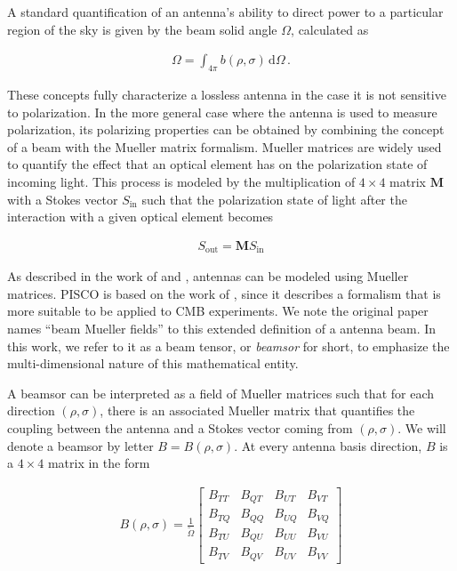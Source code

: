 \documentclass[a4paper,11pt]{article}
\begin{document}
\noindent
A standard quantification of an antenna's ability to direct power to a particular region of the sky is given by the beam solid angle $\Omega$, calculated as

\begin{equation}
\begin{aligned}
\Omega = \int_{4\pi} b(\rho,\sigma) \, \mathrm{d} \Omega \, .
\end{aligned}
\label{eq::omega_def}
\end{equation}

These concepts fully characterize a lossless antenna in the case it is not sensitive to polarization. In the more general case where the antenna is used to measure polarization, its polarizing properties can be obtained by combining the concept of a beam with the Mueller matrix formalism. Mueller matrices are widely used to quantify the effect that an optical element has on the polarization state of incoming light. This process is modeled by the multiplication of $4\times4$ matrix $\mathbf{M}$ with a Stokes vector $S_{\mathrm{in}}$ such that the polarization state of light after the interaction with a given optical element becomes

\begin{equation}
\begin{aligned}
S_{\mathrm{out}} = \mathbf{M} S_{\mathrm{in}}
\end{aligned}
\end{equation}

\noindent
As described in the work of \cite{piepmeier_long_njoku_2008} and \cite{2007MNRAS.376.1767O}, antennas can be modeled using Mueller matrices. PISCO is based on the work of \cite{2007MNRAS.376.1767O}, since it describes a formalism that is more suitable to be applied to CMB experiments. We note the original paper names ``beam Mueller fields'' to this extended definition of a antenna beam. In this work, we refer to it as a beam tensor, or \textsl{beamsor} for short, to emphasize the multi-dimensional nature of this mathematical entity. 

A beamsor can be interpreted as a field of Mueller matrices such that for each direction $(\rho,\sigma)$, there is an associated Mueller matrix that quantifies the coupling between the antenna and a Stokes vector coming from $(\rho,\sigma)$. We will denote a beamsor by letter $B = B(\rho,\sigma)$. At every antenna basis direction, $B$ is a $4\times4$ matrix in the form

\begin{equation}
\begin{aligned}
B(\rho,\sigma) = \frac{1}{\tilde{\Omega}}
\begin{bmatrix}
B_{TT} & B_{QT} & B_{UT} & B_{VT}\\
B_{TQ} & B_{QQ} & B_{UQ} & B_{VQ}\\
B_{TU} & B_{QU} & B_{UU} & B_{VU}\\
B_{TV} & B_{QV} & B_{UV} & B_{VV}
\end{bmatrix}
\end{aligned}
\label{eq::beamsor}
\end{equation}
\end{document}
